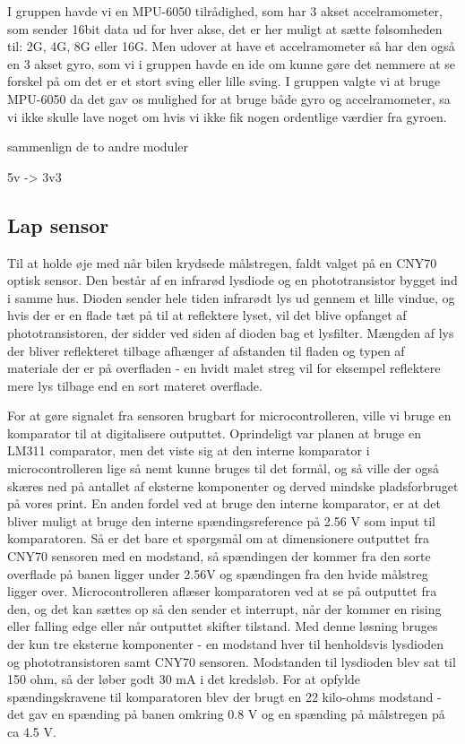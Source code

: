 I gruppen havde vi en MPU-6050 tilrådighed, som har 3 akset accelramometer, som sender 16bit data ud for hver akse, det er her muligt at sætte følsomheden til: \textpm 2G, 4G, 8G eller 16G. Men udover at have et accelramometer så har den også en 3 akset gyro, som vi i gruppen havde en ide om kunne gøre det nemmere at se forskel på om det er et stort sving eller  lille sving. I gruppen valgte vi at bruge MPU-6050 da det gav os mulighed for at bruge både gyro og accelramometer, sa vi ikke skulle lave noget om hvis vi ikke fik nogen ordentlige værdier fra gyroen.
\linebreak

sammenlign de to andre moduler

5v -> 3v3

\subsection{Lap sensor}

Til at holde øje med når bilen krydsede målstregen, faldt valget på en CNY70 optisk sensor. Den består af en infrarød lysdiode og en phototransistor bygget ind i samme hus. Dioden sender hele tiden infrarødt lys ud gennem et lille vindue, og hvis der er en flade tæt på til at reflektere lyset, vil det blive opfanget af phototransistoren, der sidder ved siden af dioden bag et lysfilter. Mængden af lys der bliver reflekteret tilbage afhænger af afstanden til fladen og typen af materiale der er på overfladen - en hvidt malet streg vil for eksempel reflektere mere lys tilbage end en sort materet overflade.

For at gøre signalet fra sensoren brugbart for microcontrolleren, ville vi bruge en komparator til at digitalisere outputtet. Oprindeligt var planen at bruge en LM311 comparator, men det viste sig at den interne komparator i microcontrolleren lige så nemt kunne bruges til det formål, og så ville der også skæres ned på antallet af eksterne komponenter og derved mindske pladsforbruget på vores print. En anden fordel ved at bruge den interne komparator, er at det bliver muligt at bruge den interne spændingsreference på 2.56 V som input til komparatoren. Så er det bare et spørgsmål om at dimensionere outputtet fra CNY70 sensoren med en modstand, så spændingen der kommer fra den sorte overflade på banen ligger under 2.56V og spændingen fra den hvide målstreg ligger over. Microcontrolleren aflæser komparatoren ved at se på outputtet fra den, og det kan sættes op så den sender et interrupt, når der kommer en rising eller falling edge eller når outputtet skifter tilstand. Med denne løsning bruges der kun tre eksterne komponenter - en modstand hver til henholdsvis lysdioden og phototransistoren samt CNY70 sensoren. Modstanden til lysdioden blev sat til 150 ohm, så der løber godt 30 mA i det kredsløb. For at opfylde spændingskravene til komparatoren blev der brugt en 22 kilo-ohms modstand - det gav en spænding på banen omkring 0.8 V og en spænding på målstregen på ca 4.5 V.

